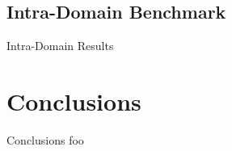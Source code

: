 \documentclass[mathserif]{beamer}
\begin{document}
\subsection{Intra-Domain Benchmark}
\begin{frame}{Intra-Domain Results}
    \begin{figure}
        
    \end{figure}
\end{frame}

\section{Conclusions}
\begin{frame}{Conclusions}
    foo
\end{frame}

\end{document}

